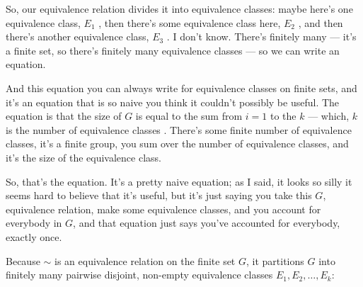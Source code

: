 \begin{proofWrapper}
\begin{speech}[00:18:54 - 00:20:32]
So, our equivalence relation divides it into equivalence classes: maybe here's one equivalence class, $E_1$ , then there's some equivalence class here, $E_2$ , and then there's another equivalence class, $E_3$ . I don't know. There's finitely many --- it's a finite set, so there's finitely many equivalence classes --- so we can write an equation.

And this equation you can always write for equivalence classes on finite sets, and it's an equation that is so naive you think it couldn't possibly be useful. The equation is that the size of $G$ is equal to the sum from $i = 1$ to the $k$ --- which, $k$ is the number of equivalence classes . There's some finite number of equivalence classes, it's a finite group, you sum over the number of equivalence classes, and it's the size of the equivalence class.

So, that's the equation. It's a pretty naive equation; as I said, it looks so silly it seems hard to believe that it's useful, but it's just saying you take this $G$, equivalence relation, make some equivalence classes, and you account for everybody in $G$, and that equation just says you've accounted for everybody, exactly once.
\end{speech}

\begin{content}
Because $\sim$ is an equivalence relation on the finite set $G$, it partitions $G$ into finitely many pairwise disjoint, non-empty equivalence classes $E_1, E_2, \dots, E_k$:


\end{content}
\end{proofWrapper}
